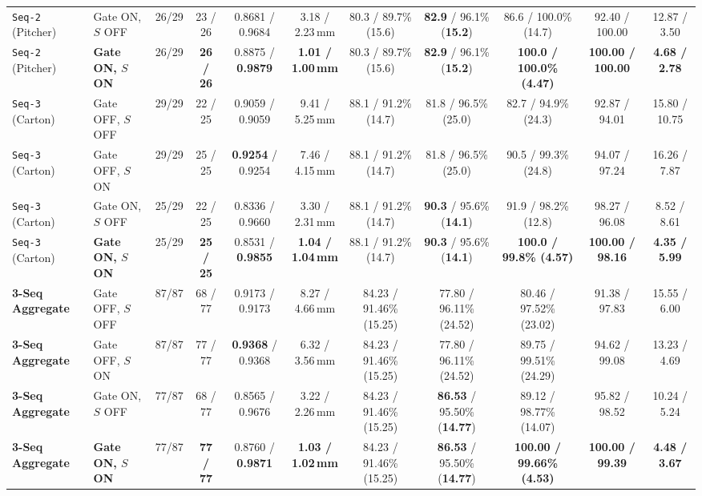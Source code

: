 \documentclass{evidencescene}
\begin{document}
\begin{table}[t]
{\begin{tabular}{@{}llccccccccc@{}}
\texttt{Seq-2} (Pitcher) & Gate ON, $S$ OFF & 26/29 & 23 / 26 & 0.8681 / 0.9684 & 3.18 / 2.23\,mm & 80.3 / 89.7\% (15.6) & \textbf{82.9} / 96.1\% (\textbf{15.2}) & 86.6 / 100.0\% (14.7) & 92.40 / 100.00 & 12.87 / 3.50\\
\rowcolor{esrow}
\texttt{Seq-2} (Pitcher) & \textbf{Gate ON, $S$ ON} & 26/29 & \textbf{26 / 26} & 0.8875 / \textbf{0.9879} & \textbf{1.01 / 1.00\,mm} & 80.3 / 89.7\% (15.6) & \textbf{82.9} / 96.1\% (\textbf{15.2}) & \textbf{100.0 / 100.0\% (4.47)} & \textbf{100.00 / 100.00} & \textbf{4.68 / 2.78}\\\midrule
\texttt{Seq-3} (Carton) & Gate OFF, $S$ OFF & 29/29 & 22 / 25 & 0.9059 / 0.9059 & 9.41 / 5.25\,mm & 88.1 / 91.2\% (14.7) & 81.8 / 96.5\% (25.0) & 82.7 / 94.9\% (24.3) & 92.87 / 94.01 & 15.80 / 10.75\\
\texttt{Seq-3} (Carton) & Gate OFF, $S$ ON & 29/29 & 25 / 25 & \textbf{0.9254} / 0.9254 & 7.46 / 4.15\,mm & 88.1 / 91.2\% (14.7) & 81.8 / 96.5\% (25.0) & 90.5 / 99.3\% (24.8) & 94.07 / 97.24 & 16.26 / 7.87\\
\texttt{Seq-3} (Carton) & Gate ON, $S$ OFF & 25/29 & 22 / 25 & 0.8336 / 0.9660 & 3.30 / 2.31\,mm & 88.1 / 91.2\% (14.7) & \textbf{90.3} / 95.6\% (\textbf{14.1}) & 91.9 / 98.2\% (12.8) & 98.27 / 96.08 & 8.52 / 8.61\\
\rowcolor{esrow}
\texttt{Seq-3} (Carton) & \textbf{Gate ON, $S$ ON} & 25/29 & \textbf{25 / 25} & 0.8531 / \textbf{0.9855} & \textbf{1.04 / 1.04\,mm} & 88.1 / 91.2\% (14.7) & \textbf{90.3} / 95.6\% (\textbf{14.1}) & \textbf{100.0 / 99.8\% (4.57)} & \textbf{100.00 / 98.16} & \textbf{4.35 / 5.99}\\\midrule
\textbf{3-Seq Aggregate} & Gate OFF, $S$ OFF & 87/87 & 68 / 77 & 0.9173 / 0.9173 & 8.27 / 4.66\,mm & 84.23 / 91.46\% (15.25) & 77.80 / 96.11\% (24.52) & 80.46 / 97.52\% (23.02) & 91.38 / 97.83 & 15.55 / 6.00\\
\textbf{3-Seq Aggregate} & Gate OFF, $S$ ON & 87/87 & 77 / 77 & \textbf{0.9368} / 0.9368 & 6.32 / 3.56\,mm & 84.23 / 91.46\% (15.25) & 77.80 / 96.11\% (24.52) & 89.75 / 99.51\% (24.29) & 94.62 / 99.08 & 13.23 / 4.69\\
\textbf{3-Seq Aggregate} & Gate ON, $S$ OFF & 77/87 & 68 / 77 & 0.8565 / 0.9676 & 3.22 / 2.26\,mm & 84.23 / 91.46\% (15.25) & \textbf{86.53} / 95.50\% (\textbf{14.77}) & 89.12 / 98.77\% (14.07) & 95.82 / 98.52 & 10.24 / 5.24\\
\rowcolor{esrow}
\textbf{3-Seq Aggregate} & \textbf{Gate ON, $S$ ON} & 77/87 & \textbf{77 / 77} & 0.8760 / \textbf{0.9871} & \textbf{1.03 / 1.02\,mm} & 84.23 / 91.46\% (15.25) & \textbf{86.53} / 95.50\% (\textbf{14.77}) & \textbf{100.00 / 99.66\% (4.53)} & \textbf{100.00 / 99.39} & \textbf{4.48 / 3.67}\\
\bottomrule\end{tabular}}\end{table}
\end{document}
